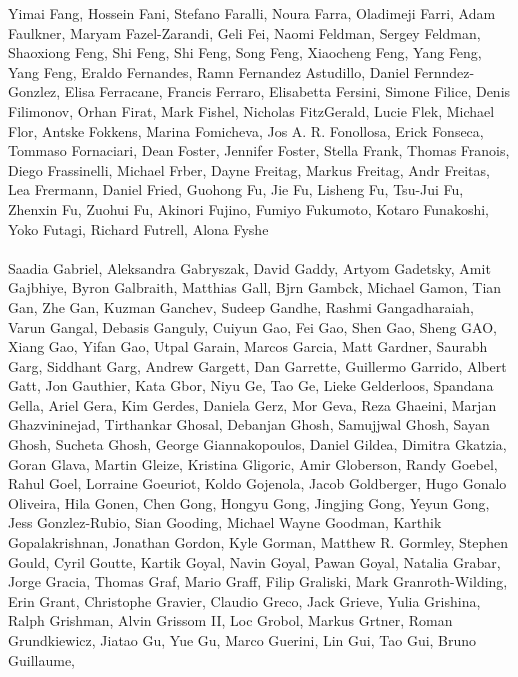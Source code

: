 \documentclass[11pt]{article}
\begin{document}
\begin{description}[itemsep=4mm, style=nextline]
Yimai Fang, 
Hossein Fani, 
Stefano Faralli, 
Noura Farra, 
Oladimeji Farri, 
Adam Faulkner, 
Maryam Fazel-Zarandi, 
Geli Fei, 
Naomi Feldman, 
Sergey Feldman, 
Shaoxiong Feng, 
Shi Feng, 
Shi Feng, 
Song Feng, 
Xiaocheng Feng, 
Yang Feng, 
Yang Feng, 
Eraldo Fernandes, 
Ramn Fernandez Astudillo, 
Daniel Fernndez-Gonzlez, 
Elisa Ferracane, 
Francis Ferraro, 
Elisabetta Fersini, 
Simone Filice, 
Denis Filimonov, 
Orhan Firat, 
Mark Fishel, 
Nicholas FitzGerald, 
Lucie Flek, 
Michael Flor, 
Antske Fokkens, 
Marina Fomicheva, 
Jos A. R. Fonollosa, 
Erick Fonseca, 
Tommaso Fornaciari, 
Dean Foster, 
Jennifer Foster, 
Stella Frank, 
Thomas Franois, 
Diego Frassinelli, 
Michael Frber, 
Dayne Freitag, 
Markus Freitag, 
Andr Freitas, 
Lea Frermann, 
Daniel Fried, 
Guohong Fu, 
Jie Fu, 
Lisheng Fu, 
Tsu-Jui Fu, 
Zhenxin Fu, 
Zuohui Fu, 
Akinori Fujino, 
Fumiyo Fukumoto, 
Kotaro Funakoshi, 
Yoko Futagi, 
Richard Futrell, 
Alona Fyshe
\\
\\
Saadia Gabriel, 
Aleksandra Gabryszak, 
David Gaddy, 
Artyom Gadetsky, 
Amit Gajbhiye, 
Byron Galbraith, 
Matthias Gall, 
Bjrn Gambck, 
Michael Gamon, 
Tian Gan, 
Zhe Gan, 
Kuzman Ganchev, 
Sudeep Gandhe, 
Rashmi Gangadharaiah, 
Varun Gangal, 
Debasis Ganguly, 
Cuiyun Gao, 
Fei Gao, 
Shen Gao, 
Sheng GAO, 
Xiang Gao, 
Yifan Gao, 
Utpal Garain, 
Marcos Garcia, 
Matt Gardner, 
Saurabh Garg, 
Siddhant Garg, 
Andrew Gargett, 
Dan Garrette, 
Guillermo Garrido, 
Albert Gatt, 
Jon Gauthier, 
Kata Gbor, 
Niyu Ge, 
Tao Ge, 
Lieke Gelderloos, 
Spandana Gella, 
Ariel Gera, 
Kim Gerdes, 
Daniela Gerz, 
Mor Geva, 
Reza Ghaeini, 
Marjan Ghazvininejad, 
Tirthankar Ghosal, 
Debanjan Ghosh, 
Samujjwal Ghosh, 
Sayan Ghosh, 
Sucheta Ghosh, 
George Giannakopoulos, 
Daniel Gildea, 
Dimitra Gkatzia, 
Goran Glava, 
Martin Gleize, 
Kristina Gligoric, 
Amir Globerson, 
Randy Goebel, 
Rahul Goel, 
Lorraine Goeuriot, 
Koldo Gojenola, 
Jacob Goldberger, 
Hugo Gonalo Oliveira, 
Hila Gonen, 
Chen Gong, 
Hongyu Gong, 
Jingjing Gong, 
Yeyun Gong, 
Jess Gonzlez-Rubio, 
Sian Gooding, 
Michael Wayne Goodman, 
Karthik Gopalakrishnan, 
Jonathan Gordon, 
Kyle Gorman, 
Matthew R. Gormley, 
Stephen Gould, 
Cyril Goutte, 
Kartik Goyal, 
Navin Goyal, 
Pawan Goyal, 
Natalia Grabar, 
Jorge Gracia, 
Thomas Graf, 
Mario Graff, 
Filip Graliski, 
Mark Granroth-Wilding, 
Erin Grant, 
Christophe Gravier, 
Claudio Greco, 
Jack Grieve, 
Yulia Grishina, 
Ralph Grishman, 
Alvin Grissom II, 
Loc Grobol, 
Markus Grtner, 
Roman Grundkiewicz, 
Jiatao Gu, 
Yue Gu, 
Marco Guerini, 
Lin Gui, 
Tao Gui, 
Bruno Guillaume, 

\end{description}
\end{document}
